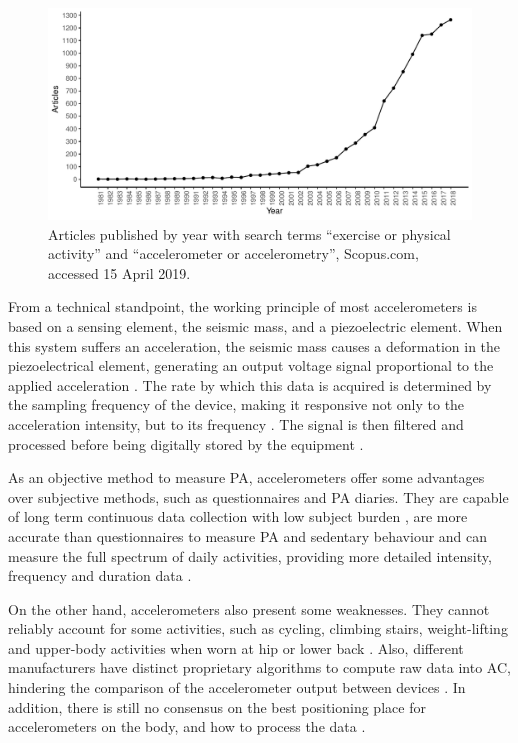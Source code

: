 \documentclass[12pt]{article}
\begin{document}
\begin{figure}[h]
	\includegraphics[width=\linewidth]{figs/fig1.pdf}
	\caption{Articles published by year with search terms ``exercise or physical activity'' and ``accelerometer or accelerometry'', Scopus.com, accessed 15 April 2019.}
	\label{art_year}
\end{figure}

From a technical standpoint, the working principle of most accelerometers is based on a sensing element, the seismic mass, and a piezoelectric element. When this system suffers an acceleration, the seismic mass causes a deformation in the piezoelectrical element, generating an output voltage signal proportional to the applied acceleration . The rate by which this data is acquired is determined by the sampling frequency of the device, making it responsive not only to the acceleration intensity, but to its frequency . The signal is then filtered and processed before being digitally stored by the equipment .

As an objective method to measure PA, accelerometers offer some advantages over subjective methods, such as questionnaires and PA diaries. They are capable of long term continuous data collection with low subject burden , are more accurate than questionnaires to measure PA and sedentary behaviour  and can measure the full spectrum of daily activities, providing more detailed intensity, frequency and duration data .

On the other hand, accelerometers also present some weaknesses. They cannot reliably account for some activities, such as cycling, climbing stairs, weight-lifting and upper-body activities when worn at hip or lower back . Also, different manufacturers have distinct proprietary algorithms to compute raw data into AC, hindering the comparison of the accelerometer output between devices . In addition, there is still no consensus on the best positioning place for accelerometers on the body, and how to process the data .
\end{document}
